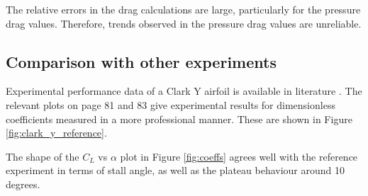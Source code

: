 \documentclass[runningheads]{llncs}
\begin{document}
The relative errors in the drag calculations are large, particularly for the pressure drag values. Therefore, trends observed in the pressure drag values are unreliable.

\subsection{Comparison with other experiments}

Experimental performance data of a Clark Y airfoil is available in literature
\cite{lyon_broeren_giguere_gopalarathnam_selig_1997}. The relevant plots on page 81 and 83 give experimental results for dimensionless coefficients measured in a more professional manner. These are shown in Figure \ref{fig:clark_y_reference}.

The shape of the $C_L$ vs $\alpha$ plot in Figure \ref{fig:coeffs} agrees well with the reference experiment in terms of stall angle, as well as the plateau behaviour around 10 degrees.
\end{document}
